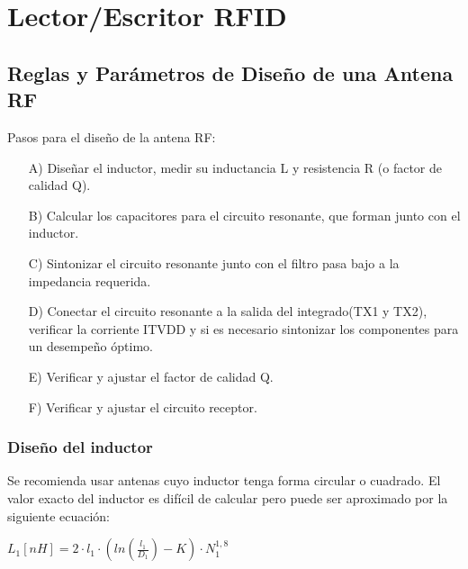 \chapter{Lector/Escritor RFID}\label{anx_antena}

\section{Reglas y Parámetros de Diseño de una Antena RF}

Pasos para el diseño de la antena RF:

\begin{itemize}
\item[A)] Diseñar el inductor, medir su inductancia L y resistencia R (o factor de calidad Q).
\item[B)] Calcular los capacitores para el circuito resonante, que forman junto con el inductor.
\item[C)] Sintonizar el circuito resonante junto con el filtro pasa bajo a la impedancia requerida.
\item[D)] Conectar el circuito resonante a la salida del integrado(TX1 y TX2), verificar la corriente ITVDD y si es necesario sintonizar los componentes para un desempeño óptimo.
\item[E)] Verificar y ajustar el factor de calidad Q.
\item[F)] Verificar y ajustar el circuito receptor.
\end{itemize}

\newpage
\subsection{Diseño del inductor}

Se recomienda usar antenas cuyo inductor tenga forma circular o cuadrado. El valor exacto del inductor es difícil de calcular pero puede ser aproximado por la siguiente ecuación:

\centerline{$ L_{1}[nH]=2 \cdot l_{1} \cdot (ln(\frac{l_{1}}{D_{1}})-K) \cdot N^{1,8}_1$}

	




